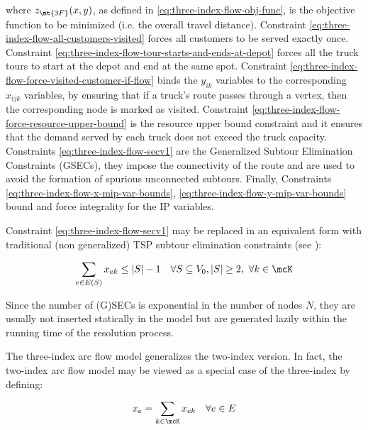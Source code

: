 where $z_\mt{3F}(x, y)$, as defined in \eqref{eq:three-index-flow-obj-func}, is the objective function to be minimized (i.e. the overall travel distance).
Constraint \eqref{eq:three-index-flow-all-customers-visited} forces all customers to be served exactly once.
Constraint \eqref{eq:three-index-flow-tour-starts-and-ends-at-depot} forces all the truck tours to start at the depot and end at the same spot.
Constraint \eqref{eq:three-index-flow-force-visited-customer-if-flow} binds the $y_{ik}$ variables to the corresponding $x_{ijk}$ variables, by ensuring that if a truck's route passes through a vertex, then the corresponding node is marked as visited.
Constraint \eqref{eq:three-index-flow-force-resource-upper-bound} is the resource upper bound constraint and it ensures that the demand served by each truck does not exceed the truck capacity.
Constraints \eqref{eq:three-index-flow-secv1} are the Generalized Subtour Elimination Constraints (GSECs), they impose the connectivity of the route and are used to avoid the formation of spurious unconnected subtours.
Finally, Constraints \eqref{eq:three-index-flow-x-mip-var-bounds}, \eqref{eq:three-index-flow-y-mip-var-bounds} bound and force integrality for the IP variables.

Constraint \eqref{eq:three-index-flow-secv1} may be replaced in an equivalent form with traditional (non generalized) TSP subtour elimination constraints (see \textcite{fisher1981}):

\begin{equation}\label{eq:three-index-flow-secv2}
	\sum_{e \in E(S)} x_{ek} \le |S| - 1 \quad \forall S \subseteq V_0, |S| \ge 2,\ \forall k \in \mcK
\end{equation}

Since the number of (G)SECs is exponential in the number of nodes $N$, they are usually not inserted statically in the model but are generated lazily within the running time of the resolution process.

The three-index arc flow model generalizes the two-index version.
In fact, the two-index arc flow model may be viewed as a special case of the three-index by defining:

\begin{equation}
    x_e = \sum_{k \in \mcK} x_{ek} \quad \forall e \in E
\end{equation}



